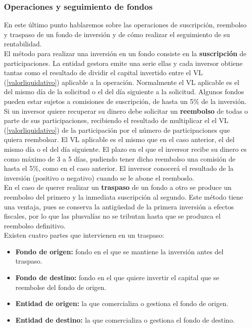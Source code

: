 \documentclass[12pt, a4paper]{article}
\begin{document}
\newpage

 \subsubsection{Operaciones y seguimiento de fondos}

En este último punto hablaremos sobre las operaciones de suscripción, reembolso y traspaso de un fondo de inversión y de cómo realizar el seguimiento de su rentabilidad.\\

El método para realizar una inversión en un fondo consiste en la \textbf{suscripción} de participaciones. La entidad gestora emite una serie ellas y cada inversor obtiene tantas como el resultado de dividir el capital invertido entre el \gls{VL} (\ref{valorliquidativo}) aplicable a la operación. Normalmente el \gls{VL} aplicable es el del mismo día de la solicitud o el del día siguiente a la solicitud. Algunos fondos pueden estar sujetos a comisiones de suscripción, de hasta un 5\% de la inversión.\\

Si un inversor quiere recuperar su dinero debe solicitar un \textbf{reembolso} de todas o parte de sus participaciones, recibiendo el resultado de multiplicar el el \gls{VL} (\ref{valorliquidativo}) de la participación por el número de participaciones que quiera reembolsar. El \gls{VL} aplicable es el mismo que en el caso anterior, el del mismo día o el del día siguiente. 
El plazo en el que el inversor recibe su dinero es como máximo de 3 a 5 días, pudiendo tener dicho reembolso una comisión de hasta el 5\%, como en el caso anterior. El inversor conocerá el resultado de la inversión (positivo o negativo) cuando se le abone el reemboslo.\\

En el caso de querer realizar un \textbf{traspaso} de un fondo a otro se produce un reembolso del primero y la inmediata suscripción al segundo. Este método tiene una ventaja, pues se conserva la antigüedad de la primera inversión a efectos fiscales, por lo que las plusvalías no se tributan hasta que se produzca el reembolso definitivo.\\

Existen cuatro partes que intervienen en un traspaso:

\begin{itemize}
	\item \textbf{Fondo de origen:} fondo en el que se mantiene la inversión antes del traspaso.
	\item \textbf{Fondo de destino:} fondo en el que quiere invertir el capital que se reembolse del fondo de origen.
	\item \textbf{Entidad de origen:} la que comercializa o gestiona el fondo de origen.
	\item \textbf{Entidad de destino:} la que comercializa o gestiona el fondo de destino.
\end{itemize}
\end{document}
